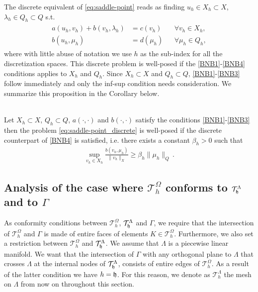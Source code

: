 \documentclass[r]{siamart171218}
\begin{document}
The discrete equivalent of \eqref{eq:saddle-point} reads as finding $u_h\in X_h\subset X$, $\lambda_h\in Q_h\subset Q$ s.t.
\begin{eqnarray}\label{eq:saddle-point_discrete}
\begin{aligned}
a(u_h,v_h)+b(v_h,\lambda_h)&=c(v_h) &&\forall v_h\in X_h,\\
b(u_h,\mu_h)&=d(\mu_h) &&\forall \mu_h\in Q_h,
\end{aligned}
\end{eqnarray}
where with little abuse of notation we use $h$ as the sub-index for all the discretization spaces.
This discrete problem is well-posed if the \eqref{BNB1}-\eqref{BNB4} conditions applies to $X_h$ and $Q_h$. Since $X_h\subset X$ and $Q_h\subset Q$,  
\eqref{BNB1}-\eqref{BNB3} follow immediately and only the inf-sup condition needs consideration.  We summarize this proposition in the Corollary below. 
\begin{corollary}{\cite[Theorem 2.42]{MR2050138}}\\
Let
$X_h \subset X$, $Q_h \subset Q$, $a(\cdot, \cdot)$ and $b(\cdot, \cdot)$ satisfy the conditions  \eqref{BNB1}-\eqref{BNB3} then  
the problem \eqref{eq:saddle-point_discrete} is well-posed if 
the discrete counterpart of \eqref{BNB4} is satisfied, i.e.
there exists a constant $\beta_h>0$ such that
\begin{align}
\label{eq:infsup_discrete}
 \sup_{v_h\in X_h} \frac{b(v_h,\mu_h)}{\|v_h\|_{X}}\geq \beta_h \|\mu_h\|_{Q}\, .
\end{align}
\end{corollary}


\subsection{Analysis of the case where $\mathcal{T}^{\Omega}_h$ conforms to $\mathcal{T}^{\Lambda}_{\mathfrak{h}}$ and to $\Gamma$}
As conformity conditions between $\mathcal{T}^{\Omega}_h$, $\mathcal{T}^{\Lambda}_{\mathfrak{h}}$ and $\Gamma$, we require that the intersection of $\mathcal{T}^{\Omega}_h$ and $\Gamma$ is made of entire faces of elements $K \in \mathcal{T}^{\Omega}_h$. Furthermore, we also set a restriction between $\mathcal{T}^{\Omega}_h$ and $\mathcal{T}^{\Lambda}_{\mathfrak{h}}$. We assume that $\Lambda$ is a piecewise linear manifold. We want that the intersection of $\Gamma$ with any orthogonal plane to $\Lambda$ that crosses $\Lambda$ at the internal nodes of $\mathcal{T}^{\Lambda}_{\mathfrak{h}}$, consists of entire edges of $\mathcal{T}^{\Omega}_h$. As a result of the latter condition we have $h=\mathfrak{h}$. 
For this reason, we denote as $\mathcal{T}^{\Lambda}_h$ the mesh on $\Lambda$
from now on throughout this section.
 
\end{document}
